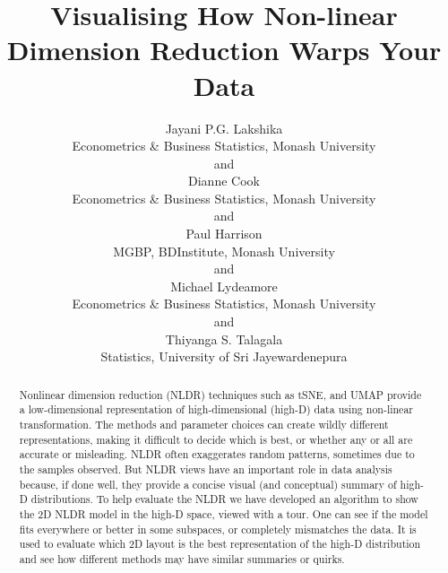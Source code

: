 \documentclass[
  12pt]{article}
\begin{document}
\def\spacingset#1{\renewcommand{\baselinestretch}%
{#1}\small\normalsize} \spacingset{1}



\title{\bf Visualising How Non-linear Dimension Reduction Warps Your
Data}
\author{
Jayani P.G. Lakshika\\
Econometrics \& Business Statistics, Monash University\\
and\\Dianne Cook\\
Econometrics \& Business Statistics, Monash University\\
and\\Paul Harrison\\
MGBP, BDInstitute, Monash University\\
and\\Michael Lydeamore\\
Econometrics \& Business Statistics, Monash University\\
and\\Thiyanga S. Talagala\\
Statistics, University of Sri Jayewardenepura\\
}
\maketitle

\bigskip
\bigskip
\begin{abstract}
Nonlinear dimension reduction (NLDR) techniques such as tSNE, and UMAP
provide a low-dimensional representation of high-dimensional (high-D)
data using non-linear transformation. The methods and parameter choices
can create wildly different representations, making it difficult to
decide which is best, or whether any or all are accurate or misleading.
NLDR often exaggerates random patterns, sometimes due to the samples
observed. But NLDR views have an important role in data analysis
because, if done well, they provide a concise visual (and conceptual)
summary of high-D distributions. To help evaluate the NLDR we have
developed an algorithm to show the 2D NLDR model in the high-D space,
viewed with a tour. One can see if the model fits everywhere or better
in some subspaces, or completely mismatches the data. It is used to
evaluate which 2D layout is the best representation of the high-D
distribution and see how different methods may have similar summaries or
quirks.
\end{abstract}
\end{document}
